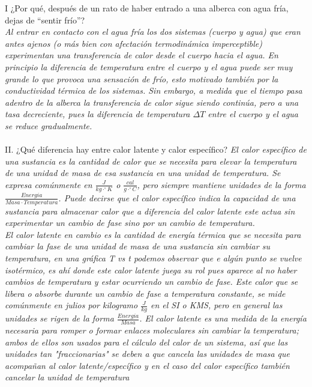 \documentclass{article}
\newcommand{\cls}{^{\circ}}
\begin{document}
I ¿Por qué, después de un rato de haber entrado a una alberca con agua fría, dejas de “sentir frío”?\\
\textit{Al entrar en contacto con el agua fría los dos sistemas (cuerpo y agua) que eran antes ajenos (o más bien con afectación termodinámica imperceptible) experimentan una transferencia de calor desde el cuerpo hacia el agua. En principio la diferencia de temperatura entre el cuerpo y el agua puede ser muy grande lo que provoca una sensación de frío, esto motivado también por la conductividad térmica de los sistemas. Sin embargo, a medida que el tiempo pasa adentro de la alberca la transferencia de calor sigue siendo continúa, pero a una tasa decreciente, pues la diferencia de temperatura $\Delta T$ entre el cuerpo y el agua se reduce gradualmente.}
\\\\


II. ¿Qué diferencia hay entre calor latente y calor específico?
\textit{El calor específico de una sustancia es la cantidad de calor que se necesita para elevar la temperatura de una unidad de masa de esa sustancia en una unidad de temperatura. Se expresa comúnmente en $ \frac{J}{kg \cdot \cls K} $ o $ \frac{cal}{g \cdot \cls C} $, pero siempre mantiene unidades de la forma $ \frac{Energia}{Masa \cdot Temperatura }$. Puede decirse que el calor específico indica la capacidad de una sustancia para almacenar calor que a diferencia del calor latente este actua sin experimentar un cambio de fase sino por un cambio de temperatura.} \\

\textit{El calor latente en cambio es la cantidad de energía térmica que se necesita para cambiar la fase de una unidad de masa de una sustancia sin cambiar su temperatura, en una gráfica T vs t podemos observar que e algún punto se vuelve isotérmico, es ahí donde este calor latente juega su rol pues aparece al no haber cambios de temperatura y estar ocurriendo un cambio de fase. Este calor que se libera o absorbe durante un cambio de fase a temperatura constante, se mide comúnmente en julios por kilogramo $\frac{J}{kg}$ en el SI o KMS, pero en general las unidades se rigen de la forma $\frac{Energia}{Masa}$. El calor latente es una medida de la energía necesaria para romper o formar enlaces moleculares sin cambiar la temperatura; ambos de ellos son usados para el cálculo del calor de un sistema, así que las unidades tan "fraccionarias" se deben a que cancela las unidades de masa que acompañan al calor latente/específico y en el caso del calor específico también cancelar la unidad de temperatura} \\\\
\end{document}
